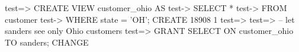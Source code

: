  test=> CREATE VIEW customer_ohio AS                 
        test-> SELECT * 
        test-> FROM customer 
        test-> WHERE state = 'OH'; 
        CREATE 18908 1 
        test=> 
        test=> -- let sanders see only Ohio customers 
        test=> GRANT SELECT ON customer_ohio TO sanders; 
        CHANGE 
